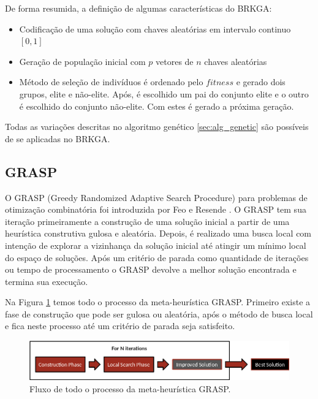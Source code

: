 \documentclass[conference]{IEEEtran}
\begin{document}
    De forma resumida, a definição de algumas características do BRKGA: 


        \begin{itemize}

        \item Codificação de uma solução com chaves aleatórias em intervalo continuo $[0,1]$ 

        \item Geração de população inicial com $p$ vetores de $n$ chaves aleatórias

        \item Método de seleção de indivíduos é ordenado pelo $fitness$ e gerado dois grupos, elite e não-elite. Após, é escolhido um pai do conjunto elite e o outro é escolhido do conjunto
            não-elite. Com estes é gerado a próxima geração. 

        \end{itemize}

        Todas as variações descritas no algoritmo genético \ref{sec:alg_genetic} são possíveis de se aplicadas no BRKGA. 

\subsection{GRASP}
\label{sec:grasp}

    O GRASP (Greedy Randomized Adaptive Search Procedure) para problemas de otimização combinatória foi introduzida por Feo e Resende \cite{feo1989probabilistic}. O GRASP tem sua iteração
    primeiramente a construção de uma solução inicial a partir de uma heurística construtiva gulosa e aleatória. Depois, é realizado uma busca local com intenção de explorar a vizinhança da
    solução inicial até atingir um mínimo local do espaço de soluções. Após um critério de parada como quantidade de iterações ou tempo de processamento o GRASP devolve a melhor solução
    encontrada e termina sua execução.

    Na Figura \ref{figura_grasp} temos todo o processo da meta-heurística GRASP. Primeiro existe a fase de construção que pode ser gulosa ou aleatória, após o método de busca local e fica
    neste processo até um critério de parada seja satisfeito.


    \begin{figure}[!htb]
  \centering
 
  \includegraphics[scale=0.35]{imagens/grasp.png}
 \caption{Fluxo de todo o processo da meta-heurística GRASP. \cite{gonccalves2014experimental}}
  \label{figura_grasp}
\end{figure}
\end{document}
